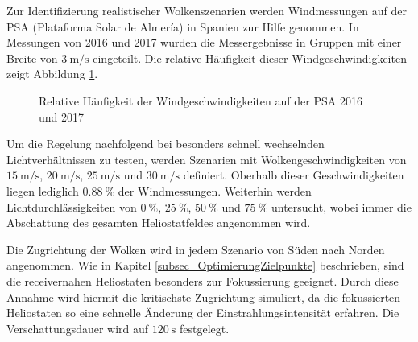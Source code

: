 Zur Identifizierung realistischer Wolkenszenarien werden Windmessungen auf der PSA (Plataforma Solar de Almería) in Spanien zur Hilfe genommen.
In Messungen von 2016 und 2017 wurden die Messergebnisse in Gruppen mit einer Breite von $\SI{3}{\metre\per\second}$ eingeteilt.
Die relative Häufigkeit dieser Windgeschwindigkeiten zeigt Abbildung \ref{fig_Windklassen}.

\begin{figure}[h!]
    \centering
    \setlength{\fboxsep}{1pt}
    \setlength{\fboxrule}{1pt}
    \caption[Relative Häufigkeit der Windgeschwindigkeiten auf der PSA 2016 und 2017]{Relative Häufigkeit der Windgeschwindigkeiten auf der PSA 2016 und 2017}
    \label{fig_Windklassen}
\end{figure}

Um die Regelung nachfolgend bei besonders schnell wechselnden Lichtverhältnissen zu testen, werden Szenarien mit Wolkengeschwindigkeiten von $\SI{15}{\metre\per\second}$, $\SI{20}{\metre\per\second}$, $\SI{25}{\metre\per\second}$ und $\SI{30}{\metre\per\second}$ definiert.
Oberhalb dieser Geschwindigkeiten liegen lediglich $\SI{0.88}{\percent}$ der Windmessungen.
Weiterhin werden Lichtdurchlässigkeiten von $\SI{0}{\percent}$, $\SI{25}{\percent}$, $\SI{50}{\percent}$ und $\SI{75}{\percent}$ untersucht, wobei immer die Abschattung des gesamten Heliostatfeldes angenommen wird.

Die Zugrichtung der Wolken wird in jedem Szenario von Süden nach Norden angenommen.
Wie in Kapitel \ref{subsec_OptimierungZielpunkte} beschrieben, sind die receivernahen Heliostaten besonders zur Fokussierung geeignet.
Durch diese Annahme wird hiermit die kritischste Zugrichtung simuliert, da die fokussierten Heliostaten so eine schnelle Änderung der Einstrahlungsintensität erfahren.
Die Verschattungsdauer wird auf $\SI{120}{\second}$ festgelegt.

